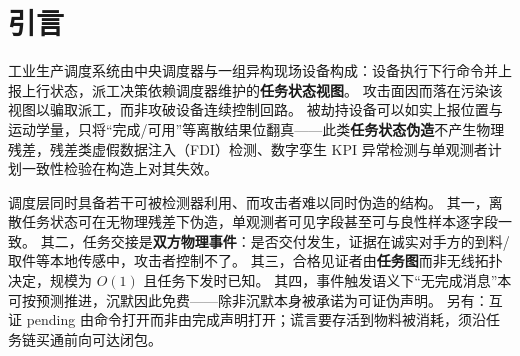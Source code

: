 \documentclass[manuscript,screen,review]{acmart}
\begin{document}

\begin{abstract}
被劫持的现场设备可如实上报物理量、只伪造离散任务状态；此类谎言不产生物理残差，单观测者族（看门狗以外的残差、过程一致性与虚假数据注入检测）在构造上无法检出。
事件触发通信下的沉默攻击面已有文献指出，见证式位置证明多按地理邻居选人，工业心跳多只管通信活性——仍缺少用\textbf{任务耦合对手方}否证完成类谎言、以及\textbf{不依赖共识分歧}的沉默归责。
本文提出两条互补通道：由任务图导出 $O(1)$ 见证集上的耦合互证，以及哈希链锚定的可问责沉默；二者合用堵住攻击者决策树，心跳间隔 $T_{\mathrm{hb}}$ 由安全预算反解而非自选。
串谋代价由互证超图前向闭包给出结构下界；检测时延的无条件上界 $r\,T_{\mathrm{hb}}$ 接入危害模型导出的时间预算（定理只接沉默通道；运动危害仅作预算量级校准）。
在 Fischertechnik Trier 工业物联网事件日志上：同协议仅更换见证选取时，空间邻居原则约恢复 52\% 检出；谎报且维持心跳（P3）仅互证有效；最严心跳带宽约 7.7\,KB/s，约为 5\,Hz 全网 PBFT 的 $1/131$。
\end{abstract}


\maketitle

\section{引言}
\label{sec:introduction}

工业生产调度系统由中央调度器与一组异构现场设备构成：设备执行下行命令并上报上行状态，派工决策依赖调度器维护的\textbf{任务状态视图}。
攻击面因而落在污染该视图以骗取派工，而非攻破设备连续控制回路。
被劫持设备可以如实上报位置与运动学量，只将``完成/可用''等离散结果位翻真——此类\textbf{任务状态伪造}不产生物理残差，残差类虚假数据注入（FDI）检测、数字孪生 KPI 异常检测与单观测者计划一致性检验在构造上对其失效。

调度层同时具备若干可被检测器利用、而攻击者难以同时伪造的结构。
其一，离散任务状态可在无物理残差下伪造，单观测者可见字段甚至可与良性样本逐字段一致。
其二，任务交接是\textbf{双方物理事件}：是否交付发生，证据在诚实对手方的到料/取件等本地传感中，攻击者控制不了。
其三，合格见证者由\textbf{任务图}而非无线拓扑决定，规模为 $O(1)$ 且任务下发时已知。
其四，事件触发语义下``无完成消息''本可按预测推进，沉默因此免费——除非沉默本身被承诺为可证伪声明。
另有：互证 pending 由命令打开而非由完成声明打开；谎言要存活到物料被消耗，须沿任务链买通前向可达闭包。
\end{document}
